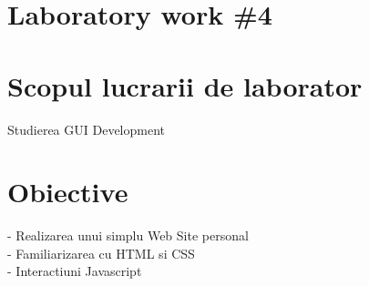 \section*{Laboratory work \#4}

\section{Scopul lucrarii de laborator}
Studierea GUI Development
\section{Obiective}

- Realizarea unui simplu Web Site personal\\
\indent 
- Familiarizarea cu HTML si CSS\\
\indent 
- Interactiuni Javascript

\clearpage